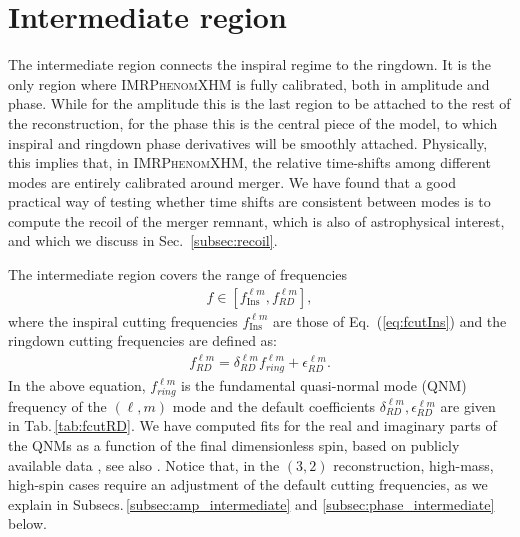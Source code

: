 \documentclass[twocolumn,prd,aps,superscriptaddress,preprintnumbers,tightenlines,showpacs,nofootinbib,eqsecnum,amsfonts,amsmath]{revtex4}
\newcommand{\phXHM}{\textsc{IMRPhenomXHM}\xspace}
\begin{document}
  
\section{Intermediate region} \label{sec:intermediate}

The intermediate region connects the inspiral regime to the ringdown. It is the only region where \phXHM is fully calibrated, both in amplitude and phase. 
While for the amplitude this is the last region to be attached to the rest of the reconstruction, for the phase this is the central piece of the model, to which inspiral and ringdown phase derivatives will be smoothly attached. Physically, this implies that, in \phXHM, the relative time-shifts among different modes are entirely calibrated around merger. 
We have found that a good practical way of testing whether time shifts are consistent between modes is to compute the recoil of the merger remnant, which is also of 
astrophysical interest, and which we discuss in Sec.~\ref{subsec:recoil}.

The intermediate region covers the range of frequencies 
\begin{align}
\label{eq:frange_int}
f\in\left[f_{\mathrm{Ins}}^{\ell m},f_{RD}^{\ell m}\right],
\end{align}
where the inspiral cutting frequencies $f_{\mathrm{Ins}}^{\ell m}$ are those of Eq.~(\ref{eq:fcutIns}) and  the ringdown cutting frequencies are defined as:
\begin{align}
\label{eq:fcutRD}
f_{RD}^{\ell m}=\delta^{\ell m}_{RD}f_{ring}^{\ell m}+\epsilon_{RD}^{\ell m}.
\end{align}
In the above equation, $f_{ring}^{\ell m}$ is the fundamental quasi-normal mode (QNM) frequency of the $(\ell,m)$ mode and the default coefficients $\delta^{\ell m}_{RD}, \epsilon_{RD}^{\ell m}$ are given in Tab.\,\ref{tab:fcutRD}. We have computed fits for the real and imaginary parts of the QNMs as a function of the final dimensionless spin, based on publicly available data \cite{bertiQNMs}, see also \cite{Berti:2009kk}. Notice that, in the $(3,2)$ reconstruction, high-mass, high-spin cases require an adjustment of the default cutting frequencies, as we explain in Subsecs.\,\ref{subsec:amp_intermediate} and \ref{subsec:phase_intermediate} below. 
\end{document}
